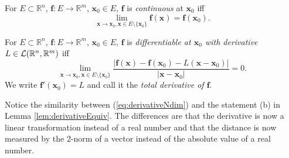 \begin{defn}
  \label{def:continuousNdim}
  For $E\subset \mathbb{R}^n$, $\mathbf{f}: E\rightarrow \mathbb{R}^m$,
  $\mathbf{x}_0\in E$, $\mathbf{f}$ is \emph{continuous} at $\mathbf{x}_0$
  iff
  \begin{equation}
    \label{eq:continuousNdim}
    \lim_{\mathbf{x}\rightarrow \mathbf{x}_{0},\mathbf{x}\in E\setminus\{\mathbf{x}_{0}\}}
    \mathbf{f}(\mathbf{x})=\mathbf{f}(\mathbf{x}_{0}).
  \end{equation}
\end{defn}

\begin{defn}
  \label{def:derivativeNdim}
  For $E\subset \mathbb{R}^n$, $\mathbf{f}: E\rightarrow \mathbb{R}^m$,
  $\mathbf{x}_0\in E$, $\mathbf{f}$ is
  \emph{differentiable at $\mathbf{x}_0$ with derivative}
  $L\in{\cal L}(\mathbb{R}^n,\mathbb{R}^m)$
  iff 
  \begin{equation}
    \label{eq:derivativeNdim}
    \lim_{\mathbf{x}\rightarrow \mathbf{x}_0, \mathbf{x}\in E\setminus\{\mathbf{x}_0\}}
    \frac{|\mathbf{f}(\mathbf{x})- \mathbf{f}(\mathbf{x}_0)
      - L(\mathbf{x}-\mathbf{x}_0)|}{|\mathbf{x}-\mathbf{x}_0|}=0. 
  \end{equation}
  We write $\mathbf{f}'(\mathbf{x}_0)=L$
  and call it the \emph{total derivative of $\mathbf{f}$}.
\end{defn}

\begin{rem}
  Notice the similarity between (\ref{eq:derivativeNdim})
  and the statement (b) in Lemma \ref{lem:derivativeEquiv}.
  The differences are that the derivative is now a linear
  transformation instead of a real number
  and that the distance is now measured by the 2-norm of a vector
  instead of the absolute value of a real number.  
\end{rem}

